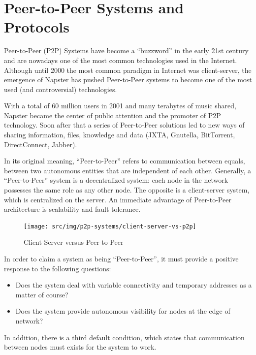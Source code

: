 
\chapter{Peer-to-Peer Systems and Protocols}
\label{chapter:p2p-systems}

Peer-to-Peer (P2P) Systems have become a ``buzzword'' in the early 21st
century and are nowadays one of the most common technologies used in the
Internet. Although until 2000 the most common paradigm in Internet was
client-server, the emergence of Napster has pushed Peer-to-Peer systems
to become one of the most used (and controversial) technologies.

With a total of 60 million users in 2001 and many terabytes of music shared,
Napster became the center of public attention and the promoter of P2P
technology. Soon after that a series of Peer-to-Peer solutions led to new
ways of sharing information, files, knowledge and data (JXTA, Gnutella,
BitTorrent, DirectConnect, Jabber).

In its original meaning, ``Peer-to-Peer'' refers to communication between
equals, between two autonomous entities that are independent of each other.
Generally, a ``Peer-to-Peer'' system is a decentralized system: each node in
the network possesses the same role as any other node. The opposite is a
client-server system, which is centralized on the server. An immediate
advantage of Peer-to-Peer architecture is scalability and fault tolerance.

\begin{figure}
  \centering
  \texttt{[image: src/img/p2p-systems/client-server-vs-p2p]}
  \caption{Client-Server versus Peer-to-Peer}
  \label{fig:p2p-systems:client-server-vs-p2p}
\end{figure}

In order to claim a system as being ``Peer-to-Peer'', it must provide a
positive response to the following questions:
\begin{itemize}
  \item Does the system deal with variable connectivity and temporary
  addresses as a matter of course?
  \item Does the system provide autonomous visibility for nodes at the edge of
  network?
\end{itemize}

In addition, there is a third default condition, which states that
communication between nodes must exists for the system to work.

